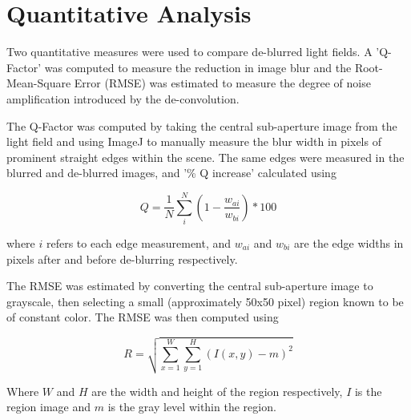 \section{Quantitative Analysis}

Two quantitative measures were used to compare de-blurred light fields.
A 'Q-Factor' was computed to measure the reduction in image blur and the Root-Mean-Square Error (RMSE) was estimated to measure the degree of noise amplification introduced by the de-convolution.

The Q-Factor was computed by taking the central sub-aperture image from the light field and using ImageJ to manually measure the blur width in pixels of prominent straight edges within the scene.
The same edges were measured in the blurred and de-blurred images, and '\% Q increase' calculated using

\begin{equation}
Q = \frac{1}{N} \sum_{i}^{N}(1 - \frac{w_{ai}}{w_{bi}}) * 100
\end{equation}

where $i$ refers to each edge measurement, and $w_{ai}$ and $w_{bi}$ are the edge widths in pixels after and before de-blurring respectively.

The RMSE was estimated by converting the central sub-aperture image to grayscale, then selecting a small (approximately 50x50 pixel) region known to be of constant color.
The RMSE was then computed using

\begin{equation}
R = \sqrt{ \sum_{x=1}^{W} \sum_{y=1}^{H} (I(x,y) - m)^2 }
\end{equation}

Where $W$ and $H$ are the width and height of the region respectively, $I$ is the region image and $m$ is the gray level within the region.

